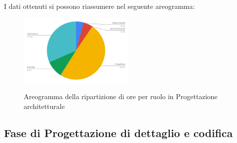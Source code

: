 I dati ottenuti si possono riassumere nel seguente areogramma:
\begin{figure}[H] 
			\centering 
				\includegraphics[width=0.5\textwidth]{res/images/areogramma_architetturale.png}\\
				\caption{Areogramma della ripartizione di ore per ruolo in Progettazione architetturale}
			\label{AreogrammaArchitetturale}
\end{figure}

\subsection{Fase di Progettazione di dettaglio e codifica}
